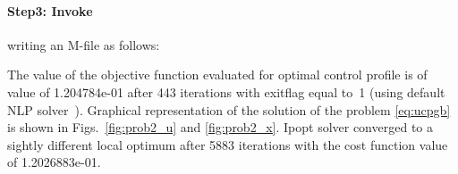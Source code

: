 \paragraph{Step3: Invoke~} writing an M-file
 as follows: 

{\small }

The value of the objective function evaluated for optimal control
profile is of value of 1.204784e-01 after 443 iterations with exitflag
equal to~1 (using default NLP solver~). Graphical
representation of the solution of the problem \eqref{eq:ucpgb} is
shown in Figs.~\ref{fig:prob2_u} and \ref{fig:prob2_x}. Ipopt solver
converged to a sightly different local optimum after 5883 iterations
with the cost function value of 1.2026883e-01.

